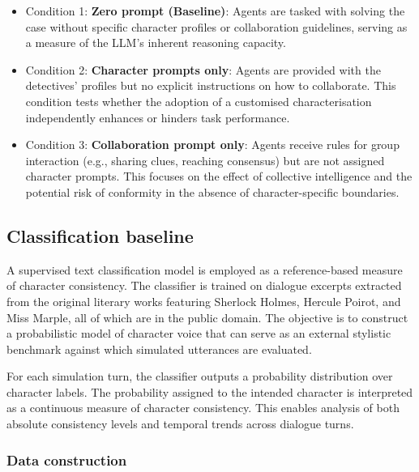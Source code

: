 \documentclass{article}
\begin{document}
\begin{itemize}
    \item Condition 1: \textbf{Zero prompt (Baseline)}: Agents are tasked with solving the case without specific character profiles or collaboration guidelines, serving as a measure of the LLM’s inherent reasoning capacity.
    \item Condition 2: \textbf{Character prompts only}: Agents are provided with the detectives' profiles but no explicit instructions on how to collaborate. This condition tests whether the adoption of a customised characterisation independently enhances or hinders task performance.
    \item Condition 3: \textbf{Collaboration prompt only}: Agents receive rules for group interaction (e.g., sharing clues, reaching consensus) but are not assigned character prompts. This focuses on the effect of collective intelligence and the potential risk of conformity in the absence of character-specific boundaries.
\end{itemize}

\subsection{Classification baseline}

A supervised text classification model is employed as a reference-based measure of character consistency. The classifier is trained on dialogue excerpts extracted from the original literary works featuring Sherlock Holmes, Hercule Poirot, and Miss Marple, all of which are in the public domain. The objective is to construct a probabilistic model of character voice that can serve as an external stylistic benchmark against which simulated utterances are evaluated.

For each simulation turn, the classifier outputs a probability distribution over character labels. The probability assigned to the intended character is interpreted as a continuous measure of character consistency. This enables analysis of both absolute consistency levels and temporal trends across dialogue turns.

\subsubsection{Data construction}
\end{document}
